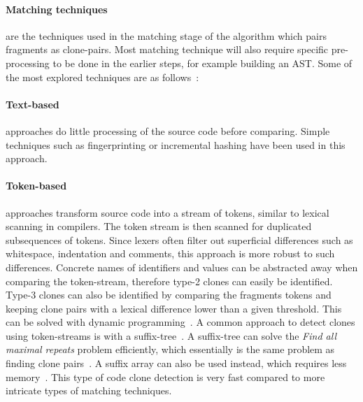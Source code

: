 \paragraph{Matching techniques} are the techniques used in the matching stage of the
algorithm which pairs fragments as clone-pairs. Most matching technique will also require
specific pre-processing to be done in the earlier steps, for example building an AST. Some
of the most explored techniques are as follows~\cite{ComparisonAndEvaluationOfTechniques}:

\paragraph{Text-based} approaches do little processing of the source code before
comparing. Simple techniques such as fingerprinting or incremental hashing have been used
in this approach. 

\paragraph{Token-based} approaches transform source code into a stream of tokens, similar
to lexical scanning in compilers. The token stream is then scanned for duplicated
subsequences of tokens. Since lexers often filter out superficial differences such as
whitespace, indentation and comments, this approach is more robust to such differences.
Concrete names of identifiers and values can be abstracted away when comparing the
token-stream, therefore type-2 clones can easily be identified. Type-3 clones can also be
identified by comparing the fragments tokens and keeping clone pairs with a lexical
difference lower than a given threshold. This can be solved with dynamic
programming~\cite{BakerSparseDynamicProgramming}. A common approach to detect clones using
token-streams is with a suffix-tree~\cite{Bakerdup}. A suffix-tree can solve the
\textit{Find all maximal repeats} problem efficiently, which essentially is the same
problem as finding clone pairs~\cite[143]{AlgorithmsOnStringsTreesSequences}. A suffix
array can also be used instead, which requires less
memory~\cite{ReplaceSuffixTreeWithEnchancedSuffixArray}. This type of code clone detection
is very fast compared to more intricate types of matching techniques.

